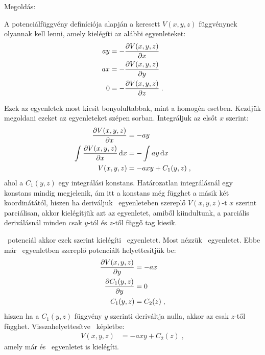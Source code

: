 
\ifdefined\megoldas
 
 Megoldás: 

 A potenciálfüggvény definíciója alapján a keresett $V(x,y,z)$ függvénynek olyannak kell lenni, amely kielégíti az alábbi egyenleteket:
 \begin{align}
  ay&=-\frac{\partial V(x,y,z)}{\partial x} \label{eq:elso} \\
  ax&=-\frac{\partial V(x,y,z)}{\partial y} \label{eq:masodik} \\
  0&=-\frac{\partial V(x,y,z)}{\partial z}\;. \label{eq:harmadik}
 \end{align}
 
 Ezek az egyenletek most kicsit bonyolultabbak, mint a homogén esetben. Kezdjük megoldani ezeket az egyenleteket szépen sorban. Integráljuk az elsőt $x$ szerint:
 \begin{align}
  \frac{\partial V(x,y,z)}{\partial x}&=-ay \\
  \int \frac{\partial V(x,y,z)}{\partial x}\,\mathrm{d} x &=-\int ay\,\mathrm{d} x\\
  V(x,y,z)&=-axy+C_1(y,z)\;,\label{eq:x}
 \end{align}
 ahol a $C_1(y,z)$ egy integrálási konstans. Határozatlan integrálásnál egy konstans mindig megjelenik, ám itt a konstans még függhet a másik két koordinátától, hiszen ha deriváljuk ~egyenleteben szereplő $V(x,y,z)$-t $x$ szerint parciálisan, akkor kielégítjük azt az egyenletet, amiből kiindultunk, a parciális deriválásnál minden csak $y$-tól és $z$-től függő tag kiesik.
 
 ~potenciál akkor ezek szerint kielégíti ~egyenletet. Most nézzük ~egyenletet. Ebbe már ~egyenletben szereplő potenciált helyettesítjük be:
 \begin{align}
  \frac{\partial V(x,y,z)}{\partial y}&=-ax \\
  \frac{\partial C_1(y,z)}{\partial y}&=0 \\ 
  C_1(y,z)&=C_2(z)\;,
 \end{align}
 hiszen ha a $C_1(y,z)$ függvény $y$ szerinti deriváltja nulla, akkor az csak $z$-től függhet.  Visszahelyettesítve ~képletbe:
 \begin{align}
  V(x,y,z)&=-axy + C_2(z)\;,\label{eq:y}
 \end{align}
 amely már  és ~egyenletet is kielégíti.

